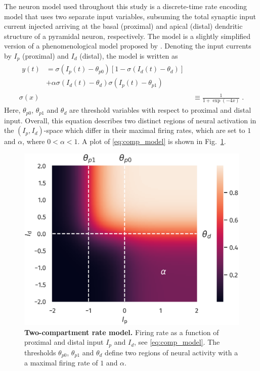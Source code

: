 \documentclass[10pt,a4paper,twocolumn]{article}
\begin{document}
		The neuron model used throughout this study is a discrete-time rate encoding model that
		uses two separate input variables, subsuming the total synaptic
		input current injected arriving at the basal (proximal) and apical (distal) 
		dendritic structure of a pyramidal neuron, respectively. The model is a slightly
		simplified version of a phenomenological model proposed by \citet{Shai_2015}.
		Denoting the input currents by $I_p$ (proximal) and $I_d$ (distal), 
		the model is written as
		\begin{align}
		\begin{split}
		y\left(t\right) &= \sigma\left( I_p(t) - \theta_{p0} \right)
		\left[1-\sigma\left(I_d(t) - \theta_d\right)\right] \\
		&+ \alpha \sigma\left(I_d(t) - \theta_d \right)\sigma\left( I_p(t) - \theta_{p1} \right)
		\end{split} \label{eq:comp_model}\\
		\sigma(x) &\equiv \frac{1}{1+\exp(-4x)} \; .
		\end{align}
		Here, $\theta_{p0}$, $\theta_{p1}$ and $\theta_d$ are threshold variables with
		respect to proximal and distal input. Overall, this equation describes two distinct
		regions of neural activation in the $(I_p, I_d)$-space which differ in their
		maximal firing rates, which are set to $1$ and $\alpha$, where $0 < \alpha < 1$.
		A plot of \eqref{eq:comp_model} is shown in Fig.~\ref{fig:comp_model}.
		\begin{figure}
			\centering
			\includegraphics[width=0.8\columnwidth]{plot_comp_mod_marks.png}
			\caption{{\bf Two-compartment rate model.} Firing rate as a
			function of proximal and distal input $I_p$ and $I_d$, 
			see \eqref{eq:comp_model}. 
			The thresholds $\theta_{p0}$, $\theta_{p1}$ and $\theta_d$ define
			two regions of neural activity with a a maximal firing rate of $1$
			and $\alpha$.}
			\label{fig:comp_model}
		\end{figure}
		
\end{document}
